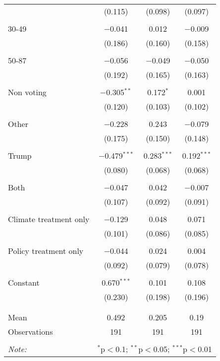 \begin{tabular}{@{\extracolsep{5pt}}lccc}
  & (0.115) & (0.098) & (0.097) \\ 
  & & & \\ 
 30-49 & $-$0.041 & 0.012 & $-$0.009 \\ 
  & (0.186) & (0.160) & (0.158) \\ 
  & & & \\ 
 50-87 & $-$0.056 & $-$0.049 & $-$0.050 \\ 
  & (0.192) & (0.165) & (0.163) \\ 
  & & & \\ 
 Non voting & $-$0.305$^{**}$ & 0.172$^{*}$ & 0.001 \\ 
  & (0.120) & (0.103) & (0.102) \\ 
  & & & \\ 
 Other & $-$0.228 & 0.243 & $-$0.079 \\ 
  & (0.175) & (0.150) & (0.148) \\ 
  & & & \\ 
 Trump & $-$0.479$^{***}$ & 0.283$^{***}$ & 0.192$^{***}$ \\ 
  & (0.080) & (0.068) & (0.068) \\ 
  & & & \\ 
 Both & $-$0.047 & 0.042 & $-$0.007 \\ 
  & (0.107) & (0.092) & (0.091) \\ 
  & & & \\ 
 Climate treatment only & $-$0.129 & 0.048 & 0.071 \\ 
  & (0.101) & (0.086) & (0.085) \\ 
  & & & \\ 
 Policy treatment only & $-$0.044 & 0.024 & 0.004 \\ 
  & (0.092) & (0.079) & (0.078) \\ 
  & & & \\ 
 Constant & 0.670$^{***}$ & 0.101 & 0.108 \\ 
  & (0.230) & (0.198) & (0.196) \\ 
  & & & \\ 
\hline \\[-1.8ex] 
Mean & 0.492 & 0.205 & 0.19 \\ 
Observations & 191 & 191 & 191 \\ 
\hline 
\hline \\[-1.8ex] 
\textit{Note:}  & \multicolumn{3}{r}{$^{*}$p$<$0.1; $^{**}$p$<$0.05; $^{***}$p$<$0.01} \\ 
\end{tabular} 

